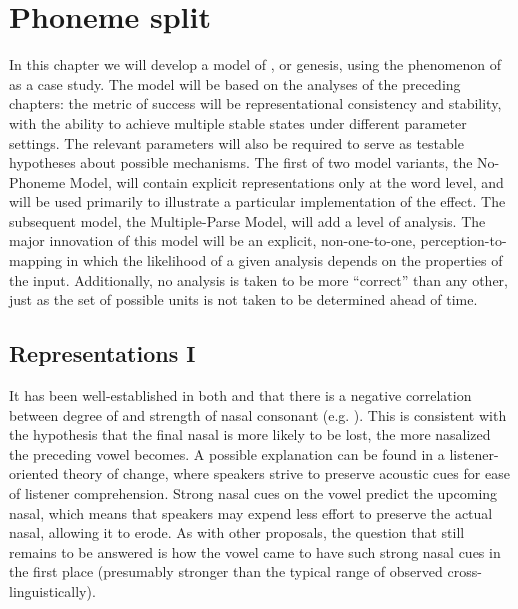 \chapter{Phoneme split}\label{ch:Phoneme-Split}

In this chapter we will develop a model of , or genesis,
using the phenomenon of  as a case study. The model
will be based on the analyses of the preceding chapters: the metric
of success will be representational consistency and stability, with
the ability to achieve multiple stable states under different parameter
settings. The relevant parameters will also be required to serve as
testable hypotheses about possible  mechanisms. The first
of two model variants, the No-Phoneme Model, will contain explicit
representations only at the word level, and will be used primarily
to illustrate a particular implementation of the  effect.
The subsequent model, the Multiple-Parse Model, will add a 
level of analysis. The major innovation of this model will be an explicit,
non-one-to-one, perception-to- mapping in which the likelihood
of a given analysis depends on the  properties of the input.
Additionally, no analysis is taken to be more ``correct'' than any other,
just as the set of possible  units is not taken to be determined
ahead of time.

\section{Representations I}\largerpage
It has been well-established in both  and  that
there is a negative correlation between degree of  and strength
of nasal consonant (e.g. \citealt{kawasaki1978perceived,cohn1990phonetic}).
This is consistent with the hypothesis that the final nasal is more
likely to be lost, the more nasalized the preceding vowel becomes.
A possible explanation can be found in a listener-oriented theory
of change, where speakers strive to preserve acoustic cues for ease
of listener comprehension. Strong nasal cues on the vowel predict
the upcoming nasal, which means that speakers may expend less effort
to preserve the actual nasal, allowing it to erode. As with other
proposals, the question that still remains to be answered is how the
vowel came to have such strong nasal cues in the first place (presumably
stronger than the typical range of   observed
cross-linguistically). 

